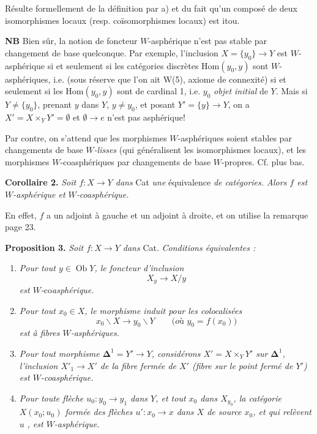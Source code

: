 \documentclass[11pt]{article}
\newcommand{\printedpage}[1]{\marginpar{\footnotesize p.~#1}}
\newcommand{\msp}[1]{\marginpar{\footnotesize [#1]}}
\newcommand{\Ob}{\operatorname{Ob}}
\begin{document}
Résulte formellement de la définition par a) et du fait qu'un composé de deux isomorphismes locaux (resp. coïsomorphismes locaux) est itou.

\textbf{NB} Bien sûr, la notion de foncteur $W$-asphérique n'est pas stable par changement de base quelconque. Par exemple, l'inclusion $X = \{y_0\} \longrightarrow Y$ est $W$-asphérique si et seulement si les catégories discrètes $\mathrm{Hom}(y_0, y)$ sont $W$-asphériques, i.e. (sous réserve que l'on ait W(5), axiome de connexité) si et seulement si les $\mathrm{Hom}(y_0, y)$ sont de cardinal 1, i.e. $y_0$ \textit{objet initial} de $Y$. Mais si $Y \neq \{y_0\}$, prenant $y$ dans $Y$, $y \neq y_0$, et posant $Y' = \{y\} \longrightarrow Y$, on a $X' = X \times_Y Y' = \emptyset$ et $\emptyset \longrightarrow e$ n'est pas asphérique!

\msp{page 26}Par contre, on s'attend que les morphismes $W$-asphériques soient stables par changements de base \textit{$W$-lisses} (qui généralisent les isomorphismes locaux), et les morphismes $W$-coasphériques par changements de base $W$-propres. Cf. plus bas.

\textbf{Corollaire 2.} \textit{Soit $f : X \longrightarrow Y$ dans} \textup{Cat} \textit{une} \textup{équivalence} \textit{de catégories. Alors $f$ est $W$-asphérique et $W$-coasphérique.}

En effet, $f$ a un adjoint à gauche et un adjoint à droite, et on utilise la remarque page 23.

\textbf{Proposition 3.} \textit{Soit $f : X \longrightarrow Y$ dans} \textup{Cat}. \textit{Conditions équivalentes :}

\printedpage{22}

\begin{enumerate}
\item[\textit{a)}] \textit{Pour tout $y \in \Ob Y$, le foncteur d'inclusion}
\[
X_y \longrightarrow X/y \tag*{$(*)$}
\]
\textit{est $W$-}co\textit{asphérique.}
\item[\textit{b)}] \textit{Pour tout $x_0 \in X$, le morphisme induit pour les colocalisées}
\[
x_0\backslash X \longrightarrow y_0\backslash Y \qquad \textit{(où $y_0 = f(x_0)$)}
\]
\textit{est à fibres $W$-asphériques.}
\item[\textit{c)}] \textit{Pour tout morphisme $\mathbf{\Delta}^1 = Y' \longrightarrow Y$, considérons $X' = X \times_Y Y'$ sur $\mathbf{\Delta}^1$, l'inclusion $X'_1 \longrightarrow X'$ de la fibre fermée de $X'$ (fibre sur le point fermé de $Y'$) est $W$-coasphérique.}
\item[\textit{d)}] \textit{Pour toute flèche $u_0 : y_0 \longrightarrow y_1$ dans $Y$, et tout $x_0$ dans $X_{y_0}$, la catégorie $X(x_0;u_0)$ formée des flèches $u' : x_0 \longrightarrow x$ dans $X$ de source $x_0$, et qui relèvent $u$} \textit{, est $W$-asphérique.}
\end{enumerate}
\end{document}
